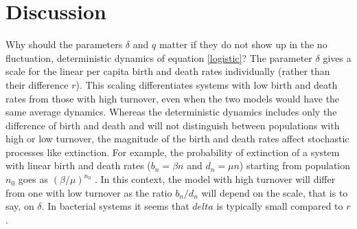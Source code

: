 \section{Discussion}

Why should the parameters $\delta$ and $q$ matter if they do not show up in the no fluctuation, deterministic dynamics of equation \ref{logistic}? 
The parameter $\delta$ gives a scale for the linear per capita birth and death rates individually (rather than their difference $r$).
This scaling differentiates systems with low birth and death rates from those with high turnover, even when the two models would have the same average dynamics. 
Whereas the deterministic dynamics includes only the difference of birth and death and will not distinguish between populations with high or low turnover, the magnitude of the birth and death rates affect stochastic processes like extinction. 
For example, the probability of extinction of a system with linear birth and death rates ($b_n=\beta n$ and $d_n=\mu n$) starting from population $n_0$ goes as $(\beta/\mu)^{n_0}$ \cite{Nisbet1982}.
In this context, the model with high turnover will differ from one with low turnover as the ratio $b_n/d_n$ will depend on the scale, that is to say, on $\delta$. 
In bacterial systems it seems that $delta$ is typically small compared to $r$ \cite{Servais1985}. 

